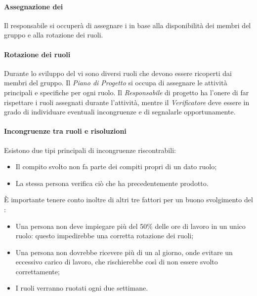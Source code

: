 \paragraph*{Assegnazione dei } Il responsabile si occuperà di assegnare i  in base alla disponibilità dei membri del gruppo e alla rotazione dei ruoli.

\paragraph*{Rotazione dei ruoli}

Durante lo sviluppo del  vi sono diversi ruoli che devono essere ricoperti dai membri del gruppo. Il \textit{Piano di Progetto} si occupa di assegnare le attività principali e specifiche per ogni ruolo. Il \textit{Responsabile} di progetto ha l'onere di far rispettare i ruoli assegnati durante l'attività, mentre il \textit{Verificatore} deve essere in grado di individuare eventuali incongruenze e di segnalarle opportunamente.
\paragraph*{Incongruenze tra ruoli e risoluzioni}
Esistono due tipi principali di incongruenze riscontrabili:
\begin{itemize}

\item Il compito svolto non fa parte dei compiti propri di un dato ruolo;
\item La stessa persona verifica ciò che ha precedentemente prodotto.
\end{itemize}

È importante tenere conto inoltre di altri tre fattori per un buono svolgimento del :
\begin{itemize}

\item Una persona non deve impiegare più del 50\% delle ore di lavoro in un unico ruolo: questo impedirebbe una corretta rotazione dei ruoli;
\item Una persona non dovrebbe ricevere più di un  al giorno, onde evitare un eccessivo carico di lavoro, che rischierebbe cos\`i di non essere svolto correttamente;
\item I ruoli verranno ruotati ogni due settimane.

\end{itemize}

